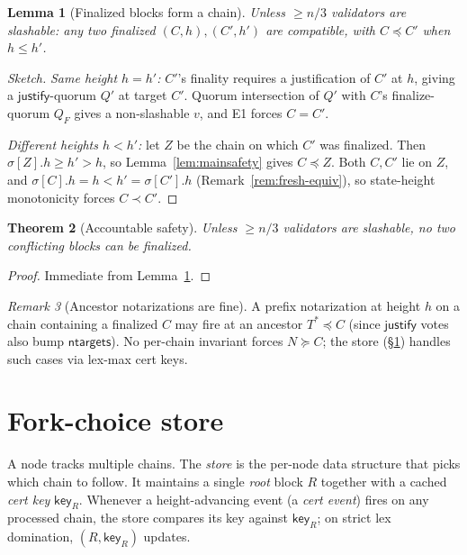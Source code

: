 \documentclass{article}
\newcommand{\just}{\ensuremath{\mathsf{justify}}\xspace}
\newcommand{\ntargets}{\mathsf{ntargets}}
\newcommand{\key}{\mathsf{key}}
\theoremstyle{plain}
\newtheorem{theorem}{Theorem}
\newtheorem{lemma}[theorem]{Lemma}
\theoremstyle{definition}
\theoremstyle{remark}
\newtheorem{remark}[theorem]{Remark}
\begin{document}
\begin{lemma}[Finalized blocks form a chain]\label{lem:finchain}
Unless $\geq n/3$ validators are slashable: any two finalized $(C, h), (C', h')$ are compatible, with $C \preceq C'$ when $h \leq h'$.
\end{lemma}

\begin{proof}[Sketch]
\emph{Same height $h = h'$:} $C'$'s finality requires a justification of $C'$ at $h$, giving a \just{}-quorum $Q'$ at target $C'$. Quorum intersection of $Q'$ with $C$'s finalize-quorum $Q_F$ gives a non-slashable $v$, and E1 forces $C = C'$.

\emph{Different heights $h < h'$:} let $Z$ be the chain on which $C'$ was finalized. Then $\sigma[Z].h \geq h' > h$, so Lemma~\ref{lem:mainsafety} gives $C \preceq Z$. Both $C, C'$ lie on $Z$, and $\sigma[C].h = h < h' = \sigma[C'].h$ (Remark~\ref{rem:fresh-equiv}), so state-height monotonicity forces $C \prec C'$.
\end{proof}

\begin{theorem}[Accountable safety]\label{thm:safety}
Unless $\geq n/3$ validators are slashable, no two conflicting blocks can be finalized.
\end{theorem}

\begin{proof}[Proof]
Immediate from Lemma~\ref{lem:finchain}.
\end{proof}

\begin{remark}[Ancestor notarizations are fine]\label{rem:notar-safety}
A prefix notarization at height $h$ on a chain containing a finalized $C$ may fire at an ancestor $T^* \preceq C$ (since \just{} votes also bump $\ntargets$). No per-chain invariant forces $N \succeq C$; the store (\S\ref{sec:store}) handles such cases via lex-max cert keys.
\end{remark}

\section{Fork-choice store}\label{sec:store}

A node tracks multiple chains. The \emph{store} is the per-node data structure that picks which chain to follow. It maintains a single \emph{root} block $R$ together with a cached \emph{cert key} $\key_R$. Whenever a height-advancing event (a \emph{cert event}) fires on any processed chain, the store compares its key against $\key_R$; on strict lex domination, $(R, \key_R)$ updates.
\end{document}
